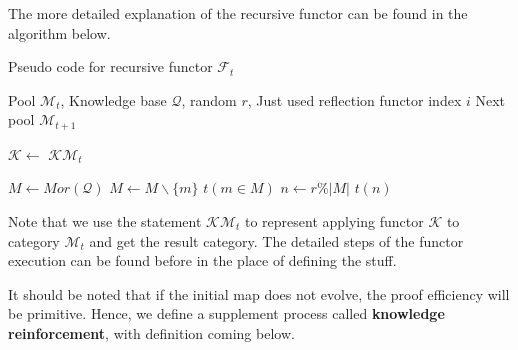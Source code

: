 \documentclass{article}
\numberwithin{theorem}{section}	%
\numberwithin{axiom}{section}	%
\numberwithin{definition}{section}	%
\begin{document}
The more detailed explanation of the recursive functor can be found in the algorithm below.

\begin{algorithm}[h]
	\caption{Pseudo code for recursive functor $\mathcal{F}_t$}
	\begin{algorithmic}[1]
		\Require Pool $\mathcal{M}_{t}$, Knowledge base $\mathcal{Q}$, random $\mathit{r}$, Just used reflection functor index $i$
		\Ensure Next pool $\mathcal{M}_{t+1}$
		
			\State $\mathcal{K} \gets $ 
			\State \Return $\mathcal{K} \mathcal{M}_t$
		\EndFunction
		
			\State $M \gets Mor(\mathcal{Q})$
					\State $M \gets M \backslash \{m\}$
				\EndIf
			\EndFor
				\State \Return $t(m \in M)$
			\Else
				\State $n \gets \mathit{r} \% |M|$
				\State \Return $t(n)$
			\EndIf
		\EndFunction
	\end{algorithmic}
\end{algorithm}

Note that we use the statement $\mathcal{K} \mathcal{M}_t$ to represent applying functor $\mathcal{K}$ to category $\mathcal{M}_t$ and get the result category. The detailed steps of the functor execution can be found before in the place of defining the stuff.

It should be noted that if the initial map does not evolve, the proof efficiency will be primitive. Hence, we define a supplement process called \textbf{ knowledge reinforcement}, with definition coming below.
\end{document}
